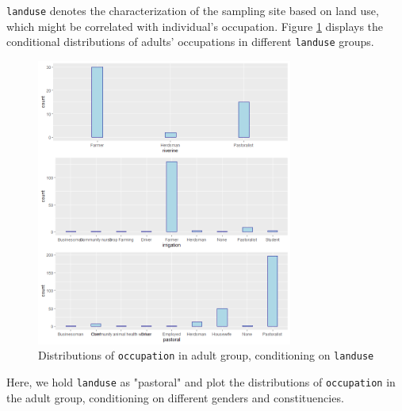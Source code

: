 \documentclass[11pt,twoside]{article}
\numberwithin{Theorem}{section}
\numberwithin{Definition}{section}
\numberwithin{Lemma}{section}
\numberwithin{Algorithm}{section}
\numberwithin{equation}{section}
\begin{document}
\texttt{landuse} denotes the characterization of the sampling site based on land use, which might be correlated with individual's occupation. Figure \ref{fig:occ3} displays the conditional distributions of adults' occupations in different \texttt{landuse} groups.

\begin{figure}[!h]
	\centering
	\includegraphics[width = 0.75\textwidth]{Images/occupation_landuse.png}
	\caption{Distributions of \texttt{occupation} in adult group, conditioning on \texttt{landuse}}
	\label{fig:occ3}		
\end{figure} 





Here, we hold \texttt{landuse} as "pastoral" and plot the distributions of \texttt{occupation} in the adult group, conditioning on different genders and constituencies. 
\end{document}
